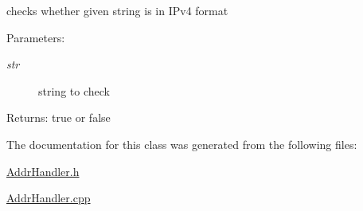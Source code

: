 checks whether given string is in IPv4 format 

\begin{Desc}
\item[Parameters:]
\begin{description}
\item[{\em str}]string to check \end{description}
\end{Desc}
\begin{Desc}
\item[Returns:]true or false \end{Desc}


The documentation for this class was generated from the following files:\begin{CompactItemize}
\item 
\hyperlink{AddrHandler_8h}{AddrHandler.h}\item 
\hyperlink{AddrHandler_8cpp}{AddrHandler.cpp}\end{CompactItemize}
